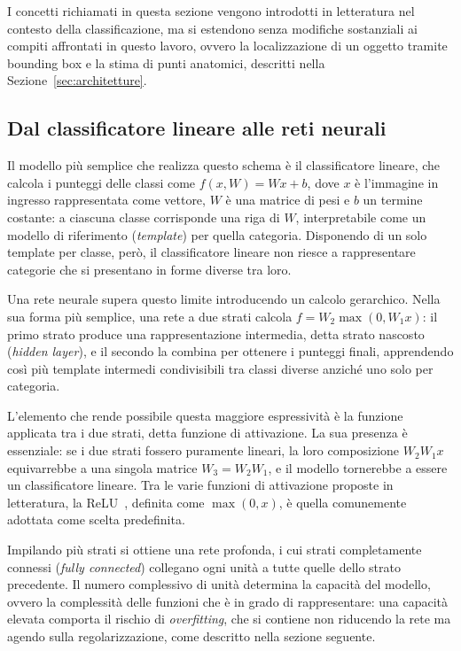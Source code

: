 I concetti richiamati in questa sezione vengono introdotti in
letteratura nel contesto della classificazione, ma si estendono senza
modifiche sostanziali ai compiti affrontati in questo lavoro, ovvero la
localizzazione di un oggetto tramite bounding box e la stima di punti
anatomici, descritti nella Sezione~\ref{sec:architetture}.

\subsection{Dal classificatore lineare alle reti neurali}
\label{sec:dal_lineare_alle_reti}

Il modello più semplice che realizza questo schema è il classificatore
lineare, che calcola i punteggi delle classi come $f(x, W) = Wx + b$,
dove $x$ è l'immagine in ingresso rappresentata come vettore, $W$ è una
matrice di pesi e $b$ un termine costante: a ciascuna classe corrisponde
una riga di $W$, interpretabile come un modello di riferimento
(\emph{template}) per quella categoria. Disponendo di un solo template
per classe, però, il classificatore lineare non riesce a rappresentare
categorie che si presentano in forme diverse tra loro.

Una rete neurale supera questo limite introducendo un calcolo
gerarchico. Nella sua forma più semplice, una rete a due strati calcola
$f = W_2 \max(0, W_1 x)$: il primo strato produce una rappresentazione
intermedia, detta strato nascosto (\emph{hidden layer}), e il secondo la
combina per ottenere i punteggi finali, apprendendo così più template
intermedi condivisibili tra classi diverse anziché uno solo per
categoria.

L'elemento che rende possibile questa maggiore espressività è la
funzione applicata tra i due strati, detta funzione di attivazione. La
sua presenza è essenziale: se i due strati fossero puramente lineari, la
loro composizione $W_2 W_1 x$ equivarrebbe a una singola matrice
$W_3 = W_2 W_1$, e il modello tornerebbe a essere un classificatore
lineare. Tra le varie funzioni di attivazione proposte in letteratura,
la ReLU~\cite{nair2010relu}, definita come $\max(0, x)$, è quella
comunemente adottata come scelta predefinita.

Impilando più strati si ottiene una rete profonda, i cui strati
completamente connessi (\emph{fully connected}) collegano ogni unità a
tutte quelle dello strato precedente. Il numero complessivo di unità
determina la capacità del modello, ovvero la complessità delle funzioni
che è in grado di rappresentare: una capacità elevata comporta il
rischio di \emph{overfitting}, che si contiene non riducendo la rete ma
agendo sulla regolarizzazione, come descritto nella sezione seguente.

